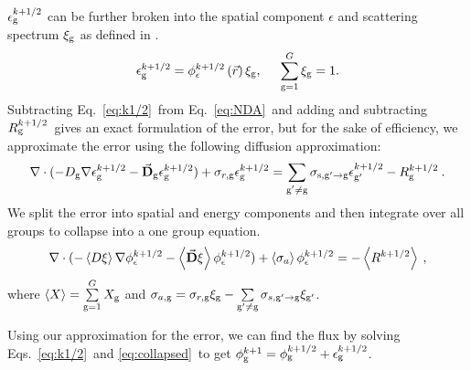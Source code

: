   $\epsilon_{\mathrm{g}}^{k + 1/2}$ can be further broken into the spatial component $\epsilon$ and scattering spectrum $\xi_{\mathrm{g}}$ as defined in \cite{morel-upscat,evans-upscat}.
  \begin{equation}
  \epsilon_{\mathrm{g}}^{k+1/2} = \phi_{\epsilon}^{k+1/2}\left(\vec{r}\right)\xi_{\mathrm{g}}, \hspace{5mm} \sum\limits_{\mathrm{g}=1}^G \xi_{\mathrm{g}} = 1.
  \end{equation}
  Subtracting Eq.\ \eqref{eq:k1/2}\ from Eq.\ \eqref{eq:NDA}\ and adding and subtracting $R_{\mathrm{g}}^{k+1/2}$\ gives an exact formulation of the error, but for the sake of efficiency, we approximate the error using the following diffusion approximation:
  \begin{equation}
  \nabla\cdot(-D_{\mathrm{g}}  \nabla \epsilon_{\mathrm{g}}^{k+1/2} - \vec{\bf D}_{\mathrm{g}}
  \epsilon_{\mathrm{g}}^{k+1/2}) + \sigma_{r,\mathrm{g}}  \epsilon_{\mathrm{g}}^{k+1/2} =  \sum\limits_{\substack{{\mathrm{g}'}\neq\mathrm{g}}} \sigma_{\mathrm{s},\mathrm{g}' \to\mathrm{g}}  \epsilon_{\mathrm{g}'}^{k+1/2} -  R^{k+1/2}_{\mathrm{g}} \:.
  \end{equation}
  We split the error into spatial and energy components and then integrate over all groups to collapse into a one group equation.
  \begin{equation}
  \nabla\cdot(-\left< D \xi \right> \nabla \phi_{\epsilon}^{k+1/2} - \left<\vec{\bf D} \xi
  \right> \phi_{\epsilon}^{k+1/2}) + \left< \sigma_{a} \right> \phi_{\epsilon}^{k+1/2} = - \left< R^{k+1/2} \right> \:,\label{eq:collapsed}
  \end{equation}
  where $\left< X \right> = \sum\limits_{\mathrm{g} = 1}^G X_{\mathrm{g}} $ and $\sigma_{a,\mathrm{g}}  = \sigma_{r,\mathrm{g}}\xi_{\mathrm{g}} - \sum\limits_{{\mathrm{g}'}\neq\mathrm{g}} \sigma_{s,\mathrm{g}'\rightarrow \mathrm{g}} \xi_{\mathrm{g}'}$.
  \par
  Using our approximation for the error, we can find the flux by solving Eqs.\ \eqref{eq:k1/2}\ and \eqref{eq:collapsed}\ to get $\phi_{\mathrm{g}}^{k+1} = \phi_{\mathrm{g}}^{k+1/2} + \epsilon_{\mathrm{g}}^{k+1/2}$.